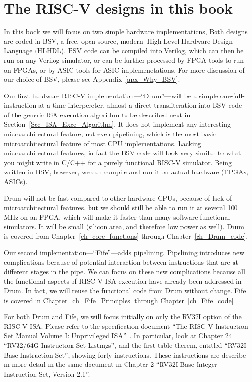 
\section{The RISC-V designs in this book}

In this book we will focus on two simple hardware implementations,
Both designs are coded in BSV, a free, open-source, modern, High-Level
Hardware Design Language (HLHDL).  BSV code can be compiled into
Verilog, which can then be run on any Verilog simulator, or can be
further processed by FPGA tools to run on FPGAs, or by ASIC tools for
ASIC implemenetations.  For more discussion of our choice of BSV,
please see Appendix~\ref{apx_Why_BSV}.

Our first hardware RISC-V implementation---``Drum''---will be a
simple one-full-instruction-at-a-time interpereter, almost a direct
transliteration into BSV code of the generic ISA execution algorithm
to be described next in Section~\ref{Sec_ISA_Exec_Algorithm}.  It does
not implement any interesting microarchitectural feature, not even
pipelining, which is the most basic microarchitectural feature of most
CPU implementations.  Lacking microarchitectural features, in fact the
BSV code will look very similar to what you might write in C/C++ for a
purely functional RISC-V simulator.  Being written in BSV, however, we
can compile and run it on actual hardware (FPGAs, ASICs).

Drum will not be fast compared to other hardware CPUs, because of lack
of microarchitectural features, but we should still be able to run it
at several 100 MHz on an FPGA, which will make it faster than many
software functional simulators.  It will be small (silicon area, and
therefore low power as well).  Drum is covered from
Chapter~\ref{ch_core_functions} through Chapter~\ref{ch_Drum_code}.

Our second implementation---``Fife''---adds pipelining.  Pipelining
introduces new complications because of potential interaction between
instructions that are at different stages in the pipe.  We can focus
on these new complications because all the functional aspects of
RISC-V ISA execution have already been addressed in Drum.  In fact, we
will reuse the functional code from Drum without change.  Fife is
covered in Chapter~\ref{ch_Fife_Principles} through
Chapter~\ref{ch_Fife_code}.

For both Drum and Fife, we will focus initially on only the RV32I
option of the RISC-V ISA.  Please refer to the specification document
``The RISC-V Instruction Set Manual Volume I: Unprivileged
ISA''~\cite{RISCV_Unpriv_2019_12_13}.  In particular, look at Chapter
24 ``RV32/64G Instruction Set Listings'', and the first table therein,
entitled ``RV32I Base Instruction Set'', showing forty instructions.
These instructions are describe in more detail in the same document in
Chapter 2 ``RV32I Base Integer Instruction Set, Version 2.1''.

